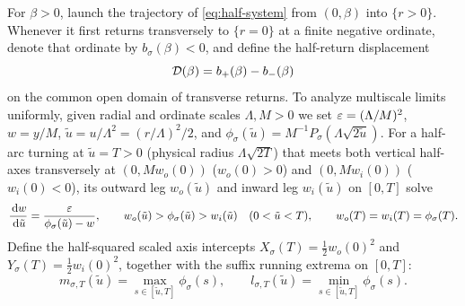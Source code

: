 For $\beta>0$, launch the trajectory of \eqref{eq:half-system} from $(0,\beta)$ into $\{r>0\}$.
Whenever it first returns transversely to $\{r=0\}$ at a finite negative ordinate, denote that
ordinate by $b_\sigma(\beta)<0$, and define the half-return displacement
\[
  \mathcal{D}(\beta) = b_+(\beta) - b_-(\beta)
\]
on the common open domain of transverse returns. To analyze multiscale limits uniformly, given radial
and ordinate scales $\Lambda,M>0$ we set $\varepsilon=(\Lambda/M)^2$, $w=y/M$, $\tilde{u}=u/\Lambda^2=(r/\Lambda)^2/2$, and
$\phi_\sigma(\tilde{u})=M^{-1}P_\sigma(\Lambda\sqrt{2\tilde{u}})$. For a half-arc turning at $\tilde{u}=T>0$
(physical radius $\Lambda\sqrt{2T}$) that meets both vertical half-axes transversely at $(0,Mw_o(0))$
($w_o(0)>0$) and $(0,Mw_i(0))$ ($w_i(0)<0$), its outward leg $w_o(\tilde{u})$ and inward leg
$w_i(\tilde{u})$ on $[0,T]$ solve
\begin{equation}\label{eq:scaled-legs}
  \frac{\,\mathrm{d} w}{\,\mathrm{d}\tilde{u}} = \frac{\varepsilon}{\phi_\sigma(\tilde{u})-w}, \qquad w_o(\tilde{u}) >
  \phi_\sigma(\tilde{u}) > w_i(\tilde{u}) \quad (0<\tilde{u}<T), \qquad w_o(T)=w_i(T)=\phi_\sigma(T).
\end{equation}
Define the half-squared scaled axis intercepts $X_\sigma(T)=\frac{1}{2}w_o(0)^2$ and
$Y_\sigma(T)=\frac{1}{2}w_i(0)^2$, together with the suffix running extrema on $[0,T]$:
\begin{equation}\label{eq:running-extrema}
  m_{\sigma,T}(\tilde{u}) = \max_{s\in[\tilde{u},T]} \phi_\sigma(s), \qquad l_{\sigma,T}(\tilde{u}) =
  \min_{s\in[\tilde{u},T]} \phi_\sigma(s).
\end{equation}

